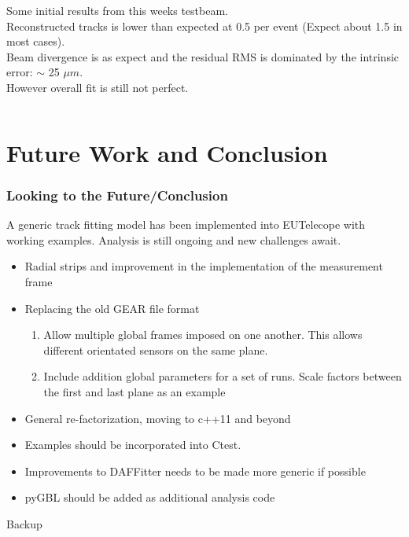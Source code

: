 \documentclass{beamer}
\begin{document}
\begin{frame}
\begin{columns}[t]
\tiny{
\vspace{10pt}
Some initial results from this weeks testbeam. \\
\vspace{10pt}
Reconstructed tracks is lower than expected at 0.5 per event (Expect about 1.5 in most cases).\\
\vspace{10pt}
Beam divergence is as expect and the residual RMS is dominated by the intrinsic error: $\sim$ 25 $\mu m$.\\
\vspace{10pt}
However overall fit is still not perfect.
}

\end{columns}
\end{frame}

\section{Future Work and Conclusion}
\begin{frame}
\frametitle{Looking to the Future/Conclusion}
A generic track fitting model has been implemented into EUTelecope with working examples. Analysis is still ongoing and new challenges await. 
\begin{itemize}
\item Radial strips and improvement in the implementation of the measurement frame
\item Replacing the old GEAR file format
\begin{enumerate}
\item Allow multiple global frames imposed on one another. This allows different orientated sensors on the same plane. 
\item Include addition global parameters for a set of runs. Scale factors between the first and last plane as an example
\end{enumerate}
\item General re-factorization, moving to c++11 and beyond 
\item Examples should be incorporated into Ctest.
\item Improvements to DAFFitter needs to be made more generic if possible
\item pyGBL should be added as additional analysis code
\end{itemize}
\end{frame}

\begin{frame}
Backup
\end{frame}
\end{document}

